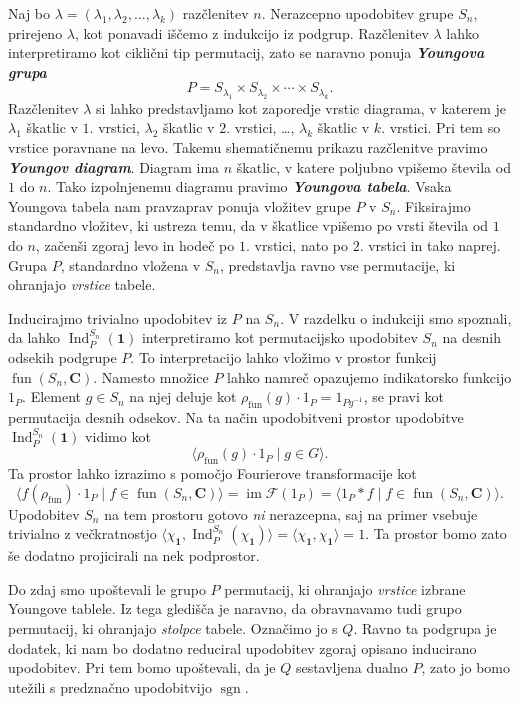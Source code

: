 \documentclass[11pt]{book}
\def\CC{\mathbf{C}}
\def\11{\mathbf{1}}
\def\Fcal{\mathcal{F}}
\DeclareMathOperator\image{im}
\DeclareMathOperator\sgn{sgn}
\DeclareMathOperator\Ind{Ind}
\DeclareMathOperator\fun{fun}
\def\definicija{\color{rdeca}\bf\em}
\theoremstyle{definition}
\theoremstyle{zgled}
\theoremstyle{odprtproblem}
\theoremstyle{domacanaloga}
\theoremstyle{izrek}
\begin{document}
Naj bo $\lambda = (\lambda_1, \lambda_2, \dots, \lambda_k)$ razčlenitev $n$. Nerazcepno upodobitev grupe $S_n$, prirejeno $\lambda$, kot ponavadi iščemo z indukcijo iz podgrup. Razčlenitev $\lambda$ lahko interpretiramo kot ciklični tip permutacij, zato se naravno ponuja {\definicija Youngova grupa}
\[
    P = S_{\lambda_1} \times S_{\lambda_2} \times \cdots \times S_{\lambda_k}.
\]
Razčlenitev $\lambda$ si lahko predstavljamo kot zaporedje vrstic diagrama, v katerem je $\lambda_1$ škatlic v $1$. vrstici, $\lambda_2$ škatlic v $2$. vrstici, \dots, $\lambda_k$ škatlic v $k$. vrstici. Pri tem so vrstice poravnane na levo. Takemu shematičnemu prikazu razčlenitve pravimo {\definicija Youngov diagram}. Diagram ima $n$ škatlic, v katere poljubno vpišemo števila od $1$ do $n$. Tako izpolnjenemu diagramu pravimo {\definicija Youngova tabela}. Vsaka Youngova tabela nam pravzaprav ponuja vložitev grupe $P$ v $S_n$. Fiksirajmo standardno vložitev, ki ustreza temu, da v škatlice vpišemo po vrsti števila od $1$ do $n$, začenši zgoraj levo in hodeč po $1$. vrstici, nato po $2$. vrstici in tako naprej. Grupa $P$, standardno vložena v $S_n$, predstavlja ravno vse permutacije, ki ohranjajo \emph{vrstice} tabele. 

Inducirajmo trivialno upodobitev iz $P$ na $S_n$. V razdelku o indukciji smo spoznali, da lahko $\Ind^{S_n}_{P}(\11)$ interpretiramo kot permutacijsko upodobitev $S_n$ na desnih odsekih podgrupe $P$. To interpretacijo lahko vložimo v prostor funkcij $\fun(S_n, \CC)$. Namesto množice $P$ lahko namreč opazujemo indikatorsko funkcijo $1_P$. Element $g \in S_n$ na njej deluje kot
$\rho_{\fun}(g) \cdot 1_P = 1_{P g^{-1}}$, se pravi kot permutacija desnih odsekov. Na ta način upodobitveni prostor upodobitve $\Ind^{S_n}_{P}(\11)$ vidimo kot 
\[
    \langle \rho_{\fun}(g) \cdot 1_{P} \mid g \in G \rangle.
\]
Ta prostor lahko izrazimo s pomočjo Fourierove transformacije kot
\[
    \langle \hat{f}(\rho_{\fun}) \cdot 1_P \mid f \in \fun(S_n, \CC) \rangle
    = \image \Fcal(1_P)
    = \langle 1_P * f \mid f \in \fun(S_n, \CC) \rangle.    
\]
Upodobitev $S_n$ na tem prostoru gotovo \emph{ni} nerazcepna, saj na primer vsebuje trivialno z večkratnostjo $\langle \chi_{\11}, \Ind^{S_n}_{P}(\chi_{\11}) \rangle = \langle \chi_{\11}, \chi_{\11} \rangle = 1$. Ta prostor bomo zato še dodatno projicirali na nek podprostor.

Do zdaj smo upoštevali le grupo $P$ permutacij, ki ohranjajo \emph{vrstice} izbrane Youngove tablele. Iz tega gledišča je naravno, da obravnavamo tudi grupo permutacij, ki ohranjajo \emph{stolpce} tabele. Označimo jo s $Q$. Ravno ta podgrupa je dodatek, ki nam bo dodatno reduciral upodobitev zgoraj opisano inducirano upodobitev. Pri tem bomo upoštevali, da je $Q$ sestavljena dualno $P$, zato jo bomo utežili s predznačno upodobitvijo $\sgn$.
\end{document}
